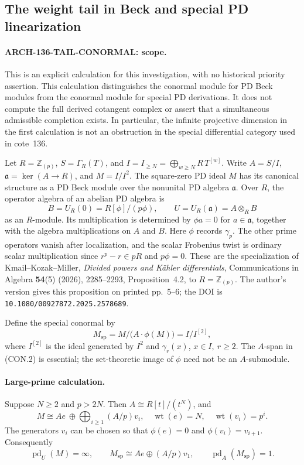 \subsection{The weight tail in Beck and special PD linearization}
\label{arch136:tail-conormal}

\paragraph{ARCH-136-TAIL-CONORMAL: scope.}
This is an explicit calculation for this investigation, with no historical
priority assertion.
This calculation distinguishes the conormal module for PD Beck modules
from the conormal module for special PD derivations. It does not compute
the full derived cotangent complex or assert that a simultaneous
admissible completion exists. In particular, the infinite projective
dimension in the first calculation is not an obstruction in the special
differential category used in cote~136.

Let \(R=\mathbb Z_{(p)}\), \(S=\Gamma_R(T)\), and
\(I=I_{\ge N}=\bigoplus_{w\ge N}R\,T^{[w]}\).
Write \(A=S/I\), \(\mathfrak a=\ker(A\to R)\), and
\(M=I/I^2\). The square-zero PD ideal \(M\) has its canonical structure
as a PD Beck module over the nonunital PD algebra \(\mathfrak a\).
Over \(R\), the operator algebra of an abelian PD algebra is
\[
 B=U_R(0)=R[\phi]/(p\phi),
 \qquad
 U=U_R(\mathfrak a)=A\otimes_R B
 \tag{CON.1}
\]
as an \(R\)-module. Its multiplication is determined by
\(\phi a=0\) for \(a\in\mathfrak a\), together with the algebra
multiplications on \(A\) and \(B\). Here \(\phi\) records \(\gamma_p\).
The other prime operators vanish after localization, and the scalar
Frobenius twist is ordinary scalar multiplication since
\(r^p-r\in pR\) and \(p\phi=0\).
These are the specialization of Kmail--Kozak--Miller,
\emph{Divided powers and K\"ahler differentials},
Communications in Algebra \textbf{54}(5) (2026), 2285--2293,
Proposition~4.2, to \(R=\mathbb Z_{(p)}\).
The author's version gives this proposition on printed pp.~5--6;
the DOI is \texttt{10.1080/00927872.2025.2578689}.

Define the special conormal by
\[
 M_{\mathrm{sp}}
   =M/\bigl(A\cdot\phi(M)\bigr)
   =I/I^{[2]},
 \tag{CON.2}
\]
where \(I^{[2]}\) is the ideal generated by \(I^2\) and
\(\gamma_r(x)\), \(x\in I,\ r\ge2\). The \(A\)-span in (CON.2) is
essential; the set-theoretic image of \(\phi\) need not be an
\(A\)-submodule.

\paragraph{Large-prime calculation.}
Suppose \(N\ge2\) and \(p>2N\). Then \(A\cong R[t]/(t^N)\), and
\[
 M\cong A e\ \oplus\!
       \bigoplus_{i\ge1}(A/p)v_i,
 \quad
 \operatorname{wt}(e)=N,\quad \operatorname{wt}(v_i)=p^i.
 \tag{CON.3}
\]
The generators \(v_i\) can be chosen so that
\(\phi(e)=0\) and \(\phi(v_i)=v_{i+1}\).
Consequently
\[
 \operatorname{pd}_{U}(M)=\infty,
 \qquad
 M_{\mathrm{sp}}\cong A e\oplus(A/p)v_1,
 \qquad
 \operatorname{pd}_{A}(M_{\mathrm{sp}})=1.
 \tag{CON.4}
\]


